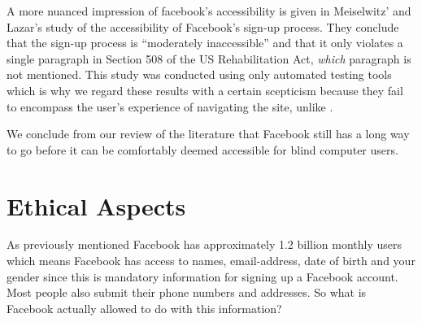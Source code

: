 \documentclass[conference]{IEEEtran}
\begin{document}
A more nuanced impression of facebook's accessibility is given in Meiselwitz'
and Lazar's \cite{meiselwitz2009} study of the accessibility of Facebook's
sign-up process. They conclude that the sign-up process is ``moderately
inaccessible'' and that it only violates a single paragraph in Section 508 of
the US Rehabilitation Act, \emph{which} paragraph is not mentioned. This study
was conducted using only automated testing tools which is why we regard these
results with a certain scepticism because they fail to encompass the user's
experience of navigating the site, unlike \cite{buzzi2010}.

We conclude from our review of the literature that Facebook still has a long
way to go before it can be comfortably deemed accessible for blind computer
users.


% 
% 
% 
% 
% 
% 

\section{Ethical Aspects}
\label{ethics}
As previously mentioned Facebook has approximately  1.2 billion monthly users
which means Facebook has access to names, email-address, date of birth and your
gender since this is mandatory information for signing up a Facebook account.
Most people also submit their phone numbers and addresses. So what is Facebook
actually allowed to do with this information?
\end{document}
